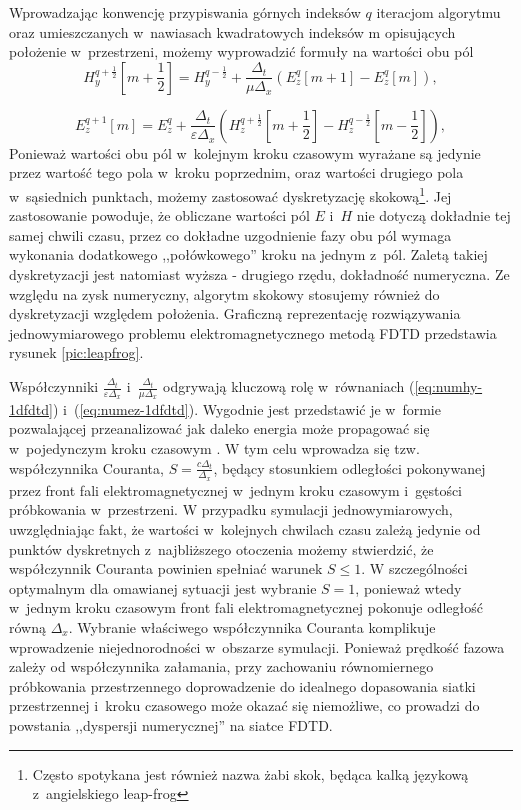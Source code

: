  Wprowadzając konwencję przypiswania górnych indeksów $q$  iteracjom algorytmu oraz umieszczanych w~nawiasach kwadratowych indeksów m opisujących położenie w~przestrzeni, możemy wyprowadzić formuły na wartości obu pól
\begin{equation}
H_y^{q+\frac{1}{2}}[m+\frac{1}{2}]=H_y^{q-\frac{1}{2}}+\frac{\Delta_t}{\mu \Delta_x}(E^q_z[m+1]-E^q_z[m]),
\label{eq:numhy-1dfdtd}
\end{equation}

\begin{equation}
E_z^{q+1}[m]=E_z^{q}+\frac{\Delta_t}{\varepsilon \Delta_x}(H^{q+\frac{1}{2}}_z[m+\frac{1}{2}]-H^{q-\frac{1}{2}}_z[m-\frac{1}{2}]),
\label{eq:numez-1dfdtd}
\end{equation}
 Ponieważ wartości obu pól w~kolejnym kroku czasowym wyrażane są jedynie przez wartość tego pola w~kroku poprzednim, oraz wartości drugiego pola w~sąsiednich punktach, możemy zastosować dyskretyzację skokową\footnote{Często spotykana jest również nazwa żabi skok, będąca kalką językową z~angielskiego leap-frog}. Jej zastosowanie powoduje, że obliczane wartości pól $E$ i~$H$ nie dotyczą dokładnie tej samej chwili czasu, przez co dokładne uzgodnienie fazy obu pól wymaga wykonania dodatkowego ,,połówkowego'' kroku na jednym z~pól. Zaletą takiej dyskretyzacji jest natomiast wyższa - drugiego rzędu, dokładność numeryczna. Ze względu na zysk numeryczny, algorytm skokowy stosujemy również do dyskretyzacji względem położenia. Graficzną reprezentację rozwiązywania jednowymiarowego problemu elektromagnetycznego metodą FDTD przedstawia rysunek \ref{pic:leapfrog}.

Współczynniki $\frac{\Delta_t}{\varepsilon \Delta_x}$ i~$\frac{\Delta_t}{\mu \Delta_x}$ odgrywają kluczową rolę w~równaniach (\ref{eq:numhy-1dfdtd}) i~(\ref{eq:numez-1dfdtd}). Wygodnie jest przedstawić je w~formie pozwalającej przeanalizować jak daleko energia może propagować się w~pojedynczym kroku czasowym \cite{understanding-fdtd}. W tym celu wprowadza się tzw. współczynnika Couranta, $S=\frac{c \Delta_t}{\Delta_x}$, będący stosunkiem odległości pokonywanej przez front fali elektromagnetycznej w~jednym kroku czasowym i~gęstości próbkowania w~przestrzeni. W przypadku symulacji jednowymiarowych, uwzględniając fakt, że wartości w~kolejnych chwilach czasu zależą jedynie od punktów dyskretnych z~najbliższego otoczenia możemy stwierdzić, że współczynnik Couranta powinien spełniać warunek $S\le1$. W szczególności optymalnym dla omawianej sytuacji jest wybranie $S=1$, ponieważ wtedy w~jednym kroku czasowym front fali elektromagnetycznej pokonuje odległość równą $\Delta_x$. Wybranie właściwego współczynnika Couranta komplikuje wprowadzenie niejednorodności w~obszarze symulacji. Ponieważ prędkość fazowa zależy od współczynnika załamania, przy zachowaniu równomiernego próbkowania przestrzennego doprowadzenie do idealnego dopasowania siatki przestrzennej i~kroku czasowego może okazać się niemożliwe, co prowadzi do powstania ,,dyspersji numerycznej'' na siatce FDTD. 

